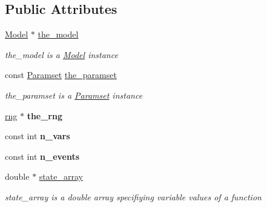 \subsection*{Public Attributes}
\begin{DoxyCompactItemize}
\item 
\mbox{\label{class_realization_a47ec1d062b8caee874b08c1a17d6aeeb}} 
\hyperlink{class_model}{Model} $\ast$ \hyperlink{class_realization_a47ec1d062b8caee874b08c1a17d6aeeb}{the\+\_\+model}
\begin{DoxyCompactList}\small\item\em the\+\_\+model is a \hyperlink{class_model}{Model} instance \end{DoxyCompactList}\item 
\mbox{\label{class_realization_a119bb29de88929bc51bc1b329473a94b}} 
const \hyperlink{class_paramset}{Paramset} \hyperlink{class_realization_a119bb29de88929bc51bc1b329473a94b}{the\+\_\+paramset}
\begin{DoxyCompactList}\small\item\em the\+\_\+paramset is a \hyperlink{class_paramset}{Paramset} instance \end{DoxyCompactList}\item 
\mbox{\label{class_realization_ac8d358d929afae90cf5790675b6744f9}} 
\hyperlink{classrng}{rng} $\ast$ {\bfseries the\+\_\+rng}
\item 
\mbox{\label{class_realization_ad9951a0829e68e12fcb3817735bb5097}} 
const int {\bfseries n\+\_\+vars}
\item 
\mbox{\label{class_realization_afb711282bef806fc0020f91252d1df2c}} 
const int {\bfseries n\+\_\+events}
\item 
\mbox{\label{class_realization_a126f89978f0407873473222171333ee1}} 
double $\ast$ \hyperlink{class_realization_a126f89978f0407873473222171333ee1}{state\+\_\+array}
\begin{DoxyCompactList}\small\item\em state\+\_\+array is a double array specifiying variable values of a function \end{DoxyCompactList}\item 
\mbox{\label{class_realization_a9c52d8c6aa0ad99dbbec1e98302db7d8}} 

\end{DoxyCompactItemize}
